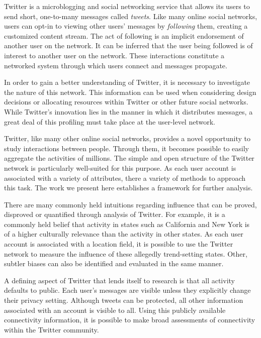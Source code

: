 Twitter is a microblogging and social networking service that allows its users to send short, one-to-many messages called \textit{tweets}.  Like many online social 
networks, users can opt-in to viewing other users' messages by \textit{following} them, creating a customized content stream.  The act of following is an implicit 
endorsement of another user on the network.  It can be inferred that the user being followed is of interest to another user on the network.  These interactions 
constitute a networked system through which users connect and messages propagate.

In order to gain a better understanding of Twitter, it is necessary to investigate the nature of this network.  This information can be used when considering design 
decisions or allocating resources within Twitter or other future social networks.  While Twitter's innovation lies in the manner in which it distributes messages, a 
great deal of this profiling must take place at the user-level network.

Twitter, like many other online social networks, provides a novel opportunity to study interactions between people.  Through them, it becomes possible to easily aggregate 
the activities of millions.  The simple and open structure of the Twitter network is particularly well-suited for this purpose.  As each user account is associated with 
a variety of attributes, there a variety of methods to approach this task.  The work we present here establishes a framework for further analysis.

There are many commonly held intuitions regarding influence that can be proved, disproved or quantified through analysis of Twitter.  For example, it is a commonly held 
belief that activity in states such as California and New York is of a higher culturally relevance than the activity in other states.  As each user account is associated 
with a location field, it is possible to use the Twitter network to measure the influence of these allegedly trend-setting states.  Other, subtler biases can also be 
identified and evaluated in the same manner.

A defining aspect of Twitter that lends itself to research is that all activity defaults to public.  Each user's messages are visible unless they explicitly change their 
privacy setting.  Although tweets can be protected, all other information associated with an account is visible to all.  Using this publicly available connectivity 
information, it is possible to make broad assessments of connectivity within the Twitter community.

